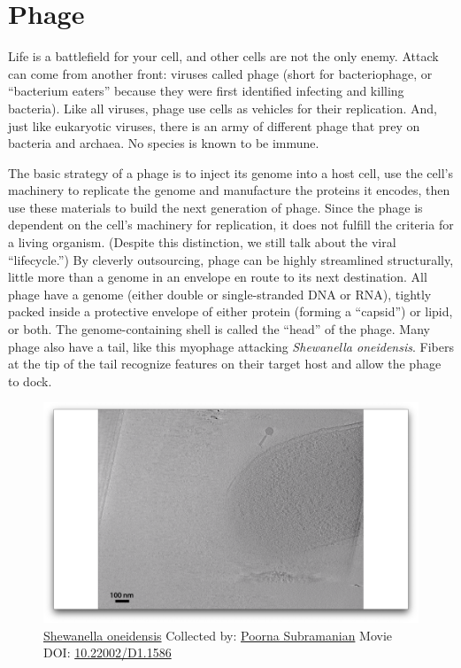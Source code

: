 \documentclass[]{tufte-book}
\begin{document}
\section{Phage}\label{phage}

Life is a battlefield for your cell, and other cells are not the only
enemy. Attack can come from another front: viruses called phage (short
for bacteriophage, or ``bacterium eaters'' because they were first
identified infecting and killing bacteria). Like all viruses, phage use
cells as vehicles for their replication. And, just like eukaryotic
viruses, there is an army of different phage that prey on bacteria and
archaea. No species is known to be immune.

The basic strategy of a phage is to inject its genome into a host cell,
use the cell's machinery to replicate the genome and manufacture the
proteins it encodes, then use these materials to build the next
generation of phage. Since the phage is dependent on the cell's
machinery for replication, it does not fulfill the criteria for a living
organism. (Despite this distinction, we still talk about the viral
``lifecycle.'') By cleverly outsourcing, phage can be highly streamlined
structurally, little more than a genome in an envelope en route to its
next destination. All phage have a genome (either double or
single-stranded DNA or RNA), tightly packed inside a protective envelope
of either protein (forming a ``capsid'') or lipid, or both. The
genome-containing shell is called the ``head'' of the phage. Many phage
also have a tail, like this myophage attacking \emph{Shewanella
oneidensis}. Fibers at the tip of the tail recognize features on their
target host and allow the phage to dock.





\begin{figure}
\includegraphics{movie_stills/10_1} \caption[\protect\hyperlink{tree}{Shewanella oneidensis} Collected by:
\protect\hyperlink{poorna_subramanian}{Poorna Subramanian} Movie DOI:
\href{https://doi.org/10.22002/D1.1586}{10.22002/D1.1586}]{\protect\hyperlink{tree}{Shewanella oneidensis} Collected by:
\protect\hyperlink{poorna_subramanian}{Poorna Subramanian} Movie DOI:
\href{https://doi.org/10.22002/D1.1586}{10.22002/D1.1586}}\label{fig:10-1}
\end{figure}
\end{document}
